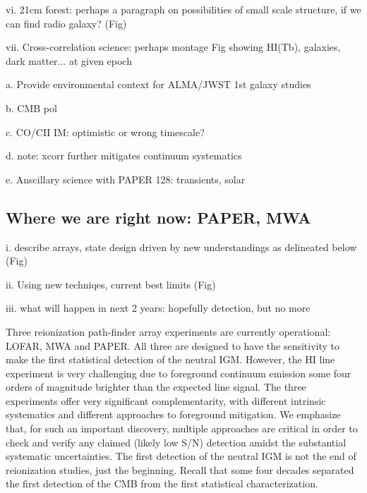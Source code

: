 \documentclass[preprint]{aastex}
\begin{document}
vi. 21cm forest: perhaps a paragraph on possibilities of small scale structure, if we can find radio galaxy? (Fig) 

vii. Cross-correlation science: perhaps montage Fig showing HI(Tb), galaxies, dark matter... at given epoch
\cite{lidz11}

a. Provide environmental context for ALMA/JWST 1st galaxy studies

b. CMB pol 

c. CO/CII IM: optimistic or wrong timescale?
  
d. note: xcorr further mitigates continuum systematics

e. Anscillary science with PAPER 128: transients, solar 

\subsection{Where we are right now: PAPER, MWA}  %

i. describe arrays, state design driven by new understandings as delineated below (Fig)

ii. Using new techniqes, current best limits  (Fig)

iii. what will happen in next 2 years: hopefully detection, but no more

Three reionization path-finder array experiments are currently
operational: LOFAR, MWA and PAPER. All three are designed to have the
sensitivity to make the first statistical detection of the neutral
IGM. However, the HI line experiment is very challenging due to
foreground continuum emission some four orders of magnitude brighter
than the expected line signal.  The three experiments offer very
significant complementarity, with different intrinsic systematics and
different approaches to foreground mitigation. We emphasize that, for
such an important discovery, multiple approaches are critical in order
to check and verify any claimed (likely low S/N) detection amidst the
substantial systematic uncertainties. The first detection of
the neutral IGM is not the end of reionization studies, just the 
beginning. Recall that some four decades separated the first detection
of the CMB from the first statistical characterization. 
\end{document}
